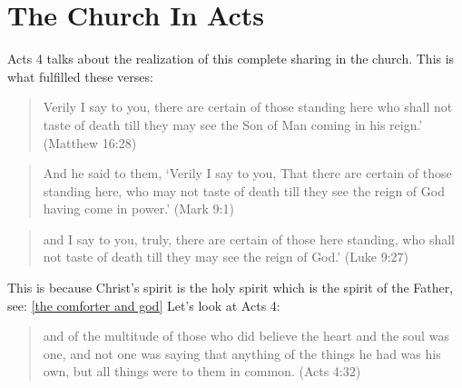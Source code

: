 \documentclass[11pt]{article}
\begin{document}
\section{The Church In Acts}
\indent Acts 4 talks about the realization of this complete sharing in the church. This is what fulfilled these verses: 
\begin{quote}
Verily I say to you, there are certain of those standing here who shall not taste of death till they may see the Son of Man coming in his reign.' (Matthew 16:28) 
\end{quote}
\begin{quote}
And he said to them, `Verily I say to you, That there are certain of those standing here, who may not taste of death till they see the reign of God having come in power.' (Mark 9:1)
\end{quote}
\begin{quote}
 and I say to you, truly, there are certain of those here standing, who shall not taste of death till they may see the reign of God.' (Luke 9:27)
\end{quote}
This is because Christ's spirit is the holy spirit which is the spirit of the Father, see: \ref{the comforter and god} 
Let's look at Acts 4:
\begin{quote}
and of the multitude of those who did believe the heart and the soul was one, and not one was saying that anything of the things he had was his own, but all things were to them in common. (Acts 4:32)
\end{quote}
\end{document}
